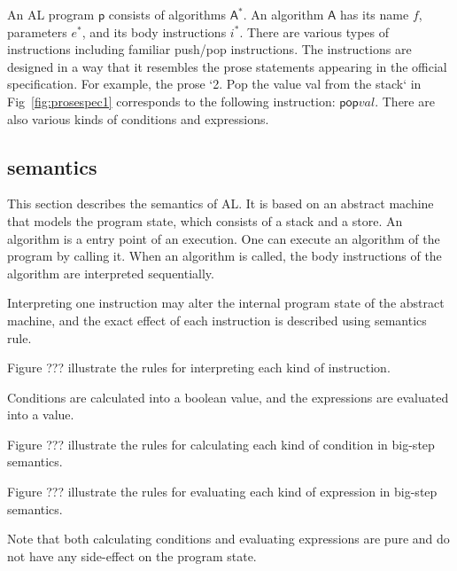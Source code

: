 An AL program $\mathsf{p}$ consists of algorithms $\mathsf{A}^\ast$.  An
algorithm $\mathsf{A}$ has its name $\mathit{f}$, parameters
${\mathit{e}^\ast}$, and its body instructions ${\mathit{i}^\ast}$.  There are
various types of instructions including familiar push/pop instructions. The
instructions are designed in a way that it resembles the prose statements
appearing in the official specification.  For example, the prose `2. Pop the
value val from the stack` in Fig~\ref{fig:prosespec1} corresponds to the following
instruction: $\mathsf{pop} \mathit{val}$. There are also various kinds of
conditions and expressions.
\subsection{semantics}

This section describes the semantics of AL. It is based on an abstract machine
that models the program state, which consists of a stack and a store. An
algorithm is a entry point of an execution. One can execute an algorithm of the
program by calling it.  When an algorithm is called, the body instructions of
the algorithm are interpreted sequentially.

Interpreting one instruction may alter the internal program state of the
abstract machine, and the exact effect of each instruction is described using
semantics rule.

Figure ???  illustrate the rules for interpreting each
kind of instruction.

Conditions are calculated into a
boolean value, and the expressions are evaluated into a value.

Figure ??? illustrate the rules for calculating each kind of condition in
big-step semantics. 

Figure ??? illustrate the rules for evaluating each kind of expression in big-step
semantics. 

Note that both calculating conditions and evaluating expressions are pure and
do not have any side-effect on the program state.


